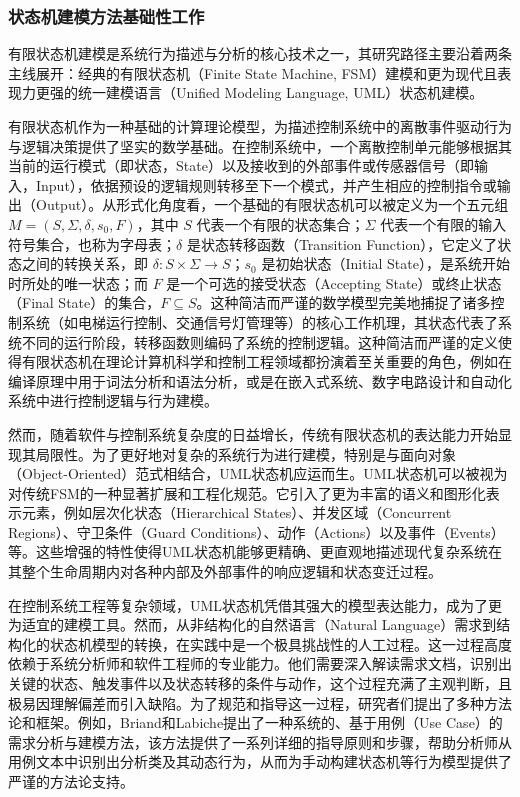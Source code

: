 \subsubsection{状态机建模方法基础性工作}


有限状态机建模是系统行为描述与分析的核心技术之一，其研究路径主要沿着两条主线展开：经典的有限状态机（Finite State Machine, FSM）建模和更为现代且表现力更强的统一建模语言（Unified Modeling Language, UML）状态机建模。

有限状态机作为一种基础的计算理论模型，为描述控制系统中的离散事件驱动行为与逻辑决策提供了坚实的数学基础。在控制系统中，一个离散控制单元能够根据其当前的运行模式（即状态，State）以及接收到的外部事件或传感器信号（即输入，Input），依据预设的逻辑规则转移至下一个模式，并产生相应的控制指令或输出（Output）。从形式化角度看，一个基础的有限状态机可以被定义为一个五元组 \( M = (S, \Sigma, \delta, s_0, F) \)，其中 \(S\) 代表一个有限的状态集合；\(\Sigma\) 代表一个有限的输入符号集合，也称为字母表；\(\delta\) 是状态转移函数（Transition Function），它定义了状态之间的转换关系，即 \(\delta: S \times \Sigma \rightarrow S\)；\(s_0\) 是初始状态（Initial State），是系统开始时所处的唯一状态；而 \(F\) 是一个可选的接受状态（Accepting State）或终止状态（Final State）的集合，\(F \subseteq S\)。这种简洁而严谨的数学模型完美地捕捉了诸多控制系统（如电梯运行控制、交通信号灯管理等）的核心工作机理，其状态代表了系统不同的运行阶段，转移函数则编码了系统的控制逻辑。这种简洁而严谨的定义使得有限状态机在理论计算机科学和控制工程领域都扮演着至关重要的角色，例如在编译原理中用于词法分析和语法分析，或是在嵌入式系统、数字电路设计和自动化系统中进行控制逻辑与行为建模。

然而，随着软件与控制系统复杂度的日益增长，传统有限状态机的表达能力开始显现其局限性。为了更好地对复杂的系统行为进行建模，特别是与面向对象（Object-Oriented）范式相结合，UML状态机应运而生。UML状态机可以被视为对传统FSM的一种显著扩展和工程化规范。它引入了更为丰富的语义和图形化表示元素，例如层次化状态（Hierarchical States）、并发区域（Concurrent Regions）、守卫条件（Guard Conditions）、动作（Actions）以及事件（Events）等。这些增强的特性使得UML状态机能够更精确、更直观地描述现代复杂系统在其整个生命周期内对各种内部及外部事件的响应逻辑和状态变迁过程。

在控制系统工程等复杂领域，UML状态机凭借其强大的模型表达能力，成为了更为适宜的建模工具。然而，从非结构化的自然语言（Natural Language）需求到结构化的状态机模型的转换，在实践中是一个极具挑战性的人工过程。这一过程高度依赖于系统分析师和软件工程师的专业能力。他们需要深入解读需求文档，识别出关键的状态、触发事件以及状态转移的条件与动作，这个过程充满了主观判断，且极易因理解偏差而引入缺陷。为了规范和指导这一过程，研究者们提出了多种方法论和框架。例如，Briand和Labiche提出了一种系统的、基于用例（Use Case）的需求分析与建模方法，该方法提供了一系列详细的指导原则和步骤，帮助分析师从用例文本中识别出分析类及其动态行为，从而为手动构建状态机等行为模型提供了严谨的方法论支持。

